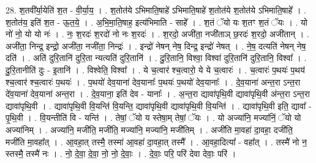 \documentclass[17pt]{extarticle}
\begin{document}
28. श॒तवी᳚र्या॒येति॑ श॒त - वी॒र्या॒य॒ । . श॒तोत॑ये ऽभिमाति॒षाहे॑ ऽभिमाति॒षाहे॑ श॒तोत॑ये श॒तोत॑ये ऽभिमाति॒षाहे᳚ । . श॒तोत॑य॒ इति॑ श॒त - ऊ॒त॒ये॒ । . अ॒भि॒मा॒ति॒षाह॒ इत्य॑भिमाति - साहे᳚ । . श॒तं ॅयो यः श॒तꣳ श॒तं ॅयः । . यो नो॑ नो॒ यो यो नः॑ । . नः॒ श॒रदः॑ श॒रदो॑ नो नः श॒रदः॑ । . श॒रदो॒ अजी॑ता॒ नजी॑ताञ् छ॒रदः॑ श॒रदो॒ अजी॑तान् । . अजी॑ता॒ निन्द्र॒ इन्द्रो॒ अजी॑ता॒ नजी॑ता॒ निन्द्रः॑ । . इन्द्रो॑ नेषन् नेष॒ दिन्द्र॒ इन्द्रो॑ नेषत् । . ने॒ष॒ दत्यति॑ नेषन् नेष॒ दति॑ । . अति॑ दुरि॒तानि॑ दुरि॒ता न्यत्यति॑ दुरि॒तानि॑ । . दु॒रि॒तानि॒ विश्वा॒ विश्वा॑ दुरि॒तानि॑ दुरि॒तानि॒ विश्वा᳚ । . दु॒रि॒तानीति॑ दुः - इ॒तानि॑ । . विश्वेति॒ विश्वा᳚ । . ये च॒त्वार॑ श्च॒त्वारो॒ ये ये च॒त्वारः॑ । . च॒त्वारः॑ प॒थयः॑ प॒थय॑ श्च॒त्वार॑ श्च॒त्वारः॑ प॒थयः॑ । . प॒थयो॑ देव॒याना॑ देव॒यानाः᳚ प॒थयः॑ प॒थयो॑ देव॒यानाः᳚ । . दे॒व॒याना॑ अन्त॒रा ऽन्त॒रा दे॑व॒याना॑ देव॒याना॑ अन्त॒रा । . दे॒व॒याना॒ इति॑ देव - यानाः᳚ । . अ॒न्त॒रा द्यावा॑पृथि॒वी द्यावा॑पृथि॒वी अ॑न्त॒रा ऽन्त॒रा द्यावा॑पृथि॒वी । . द्यावा॑पृथि॒वी वि॒यन्ति॑ वि॒यन्ति॒ द्यावा॑पृथि॒वी द्यावा॑पृथि॒वी वि॒यन्ति॑ । . द्यावा॑पृथि॒वी इति॒ द्यावा᳚ - पृ॒थि॒वी । . वि॒यन्तीति॑ वि - यन्ति॑ । . तेषां॒ ॅयो य स्तेषा॒म् तेषां॒ ॅयः । . यो अज्या॑नि॒ मज्या॑निं॒ ॅयो यो अज्या॑निम् । . अज्या॑नि॒ मजी॑ति॒ मजी॑ति॒ मज्या॑नि॒ मज्या॑नि॒ मजी॑तिम् । . अजी॑ति मा॒वहा॑ दा॒वहा॒ दजी॑ति॒ मजी॑ति मा॒वहा᳚त् । . आ॒वहा॒त् तस्मै॒ तस्मा॑ आ॒वहा॑ दा॒वहा॒त् तस्मै᳚ । . आ॒वहा॒दित्या᳚ - वहा᳚त् । . तस्मै॑ नो न॒ स्तस्मै॒ तस्मै॑ नः । . नो॒ दे॒वा॒ दे॒वा॒ नो॒ नो॒ दे॒वाः॒ । . दे॒वाः॒ परि॒ परि॑ देवा देवाः॒ परि॑ । \newline
\end{document}
